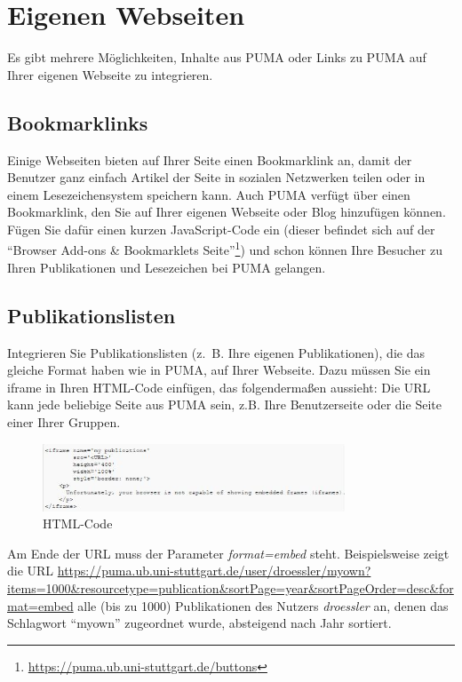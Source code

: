 \section{Eigenen Webseiten}
\label{sec:eigeneWebseiten}
Es gibt mehrere Möglichkeiten, Inhalte aus PUMA oder Links zu PUMA auf Ihrer eigenen Webseite zu integrieren.

\subsection{Bookmarklinks}
\label{subsec:bookmarklinks}
Einige Webseiten bieten  auf Ihrer Seite einen Bookmarklink an, damit der Benutzer ganz einfach Artikel der Seite in sozialen Netzwerken teilen oder in einem Lesezeichensystem speichern kann. 
\newline Auch PUMA verfügt über einen Bookmarklink, den Sie auf Ihrer eigenen Webseite oder Blog hinzufügen können. Fügen Sie dafür einen kurzen JavaScript-Code ein (dieser befindet sich auf der \enquote{Browser Add-ons \& Bookmarklets Seite}\footnote{\url{https://puma.ub.uni-stuttgart.de/buttons}}) und schon können Ihre Besucher zu Ihren Publikationen und Lesezeichen bei PUMA gelangen.

\subsection{Publikationslisten}
\label{subsec:publikationslisten}
Integrieren Sie Publikationslisten (z.~B. Ihre eigenen Publikationen), die das gleiche Format haben wie in PUMA, auf Ihrer Webseite. Dazu müssen Sie ein iframe in Ihren HTML-Code einfügen, das folgendermaßen aussieht:\newline %
Die URL kann jede beliebige Seite aus PUMA sein, z.B. Ihre Benutzerseite oder die Seite einer Ihrer Gruppen. 
\begin{figure}[h!]
 \centering
 \includegraphics[width=9cm]{Bilder/Kapitel9/HTML-Code}
 \caption{HTML-Code}
 \label{fig:htmlCode}
\end{figure}
\begin{mdframed}[style=mdfexample1,frametitle={WICHTIG},backgroundcolor=gray!40]Am Ende der URL muss der Parameter \textit{format=embed} steht. Beispielsweise zeigt die URL \url{https://puma.ub.uni-stuttgart.de/user/droessler/myown?items=1000&resourcetype=publication&sortPage=year&sortPageOrder=desc&format=embed}
 alle (bis zu 1000) Publikationen des Nutzers \textit{droessler} an, denen das Schlagwort \enquote{myown} zugeordnet wurde, absteigend nach Jahr sortiert.
\end{mdframed}
